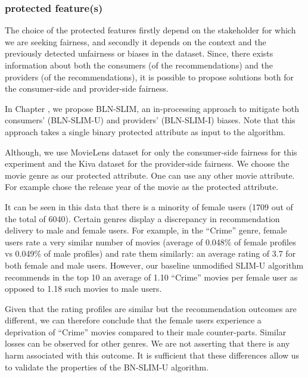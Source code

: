         \subsubsection{protected feature(s)}
        The choice of the protected features firstly depend on the stakeholder for which we are seeking fairness, and secondly it depends on the context and the previously detected unfairness or biases in the dataset. Since, there exists information about both the consumers (of the recommendations) and the providers (of the recommendations), it is possible to propose solutions both for the consumer-side and provider-side fairness.
        
        In Chapter , we propose BLN-SLIM, an in-processing approach to mitigate both consumers' (BLN-SLIM-U) and providers' (BLN-SLIM-I) biases. Note that this approach takes a single binary protected attribute as input to the algorithm.
        
        Although, we use MovieLens dataset for only the consumer-side fairness for this experiment and the Kiva dataset for the provider-side fairness. We choose the movie genre as our protected attribute. One can use any other movie attribute. For example \cite{kamishima2018recommendation} chose the release year of the movie as the protected attribute.
        
        It can be seen in this data that there is a minority of female users (1709 out of the total of 6040). Certain genres display a discrepancy in recommendation delivery to male and female users. For example, in the ``Crime'' genre, female users rate a very similar number of movies (average of 0.048\% of female profiles vs 0.049\% of male profiles) and rate them similarly: an average rating of 3.7 for both female and male users. However, our baseline unmodified SLIM-U algorithm recommends in the top 10 an average of 1.10 ``Crime'' movies per female user as opposed to 1.18 such movies to male users. 
        
        Given that the rating profiles are similar but the recommendation outcomes are different, we can therefore conclude that the female users experience a deprivation of ``Crime'' movies compared to their male counter-parts. Similar losses can be observed for other genres. We are not asserting that there is any harm associated with this outcome. It is sufficient that these differences allow us to validate the properties of the BN-SLIM-U algorithm.
        
